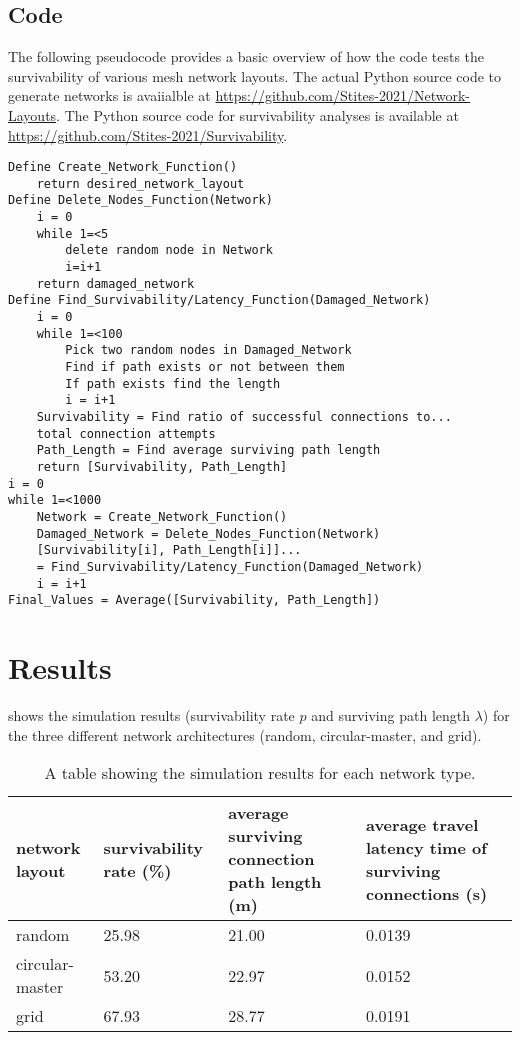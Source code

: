 \documentclass[twocolumn,10pt]{IEEEtran}
\begin{document}
\subsection{Code}
The following pseudocode provides a basic overview of how the code tests the survivability of various mesh network layouts. The actual Python source code to generate networks is avaiialble at \url{https://github.com/Stites-2021/Network-Layouts}. The Python source code for survivability analyses is available at \url{https://github.com/Stites-2021/Survivability}.  
\lstset{basicstyle=\ttfamily\scriptsize}
\begin{lstlisting}
Define Create_Network_Function()
	return desired_network_layout
Define Delete_Nodes_Function(Network)
	i = 0
	while 1=<5
		delete random node in Network 
		i=i+1
	return damaged_network
Define Find_Survivability/Latency_Function(Damaged_Network)
	i = 0
	while 1=<100
		Pick two random nodes in Damaged_Network
		Find if path exists or not between them
		If path exists find the length
		i = i+1
	Survivability = Find ratio of successful connections to... 
	total connection attempts
	Path_Length = Find average surviving path length
	return [Survivability, Path_Length]
i = 0
while 1=<1000
	Network = Create_Network_Function()
	Damaged_Network = Delete_Nodes_Function(Network)
	[Survivability[i], Path_Length[i]]...
	= Find_Survivability/Latency_Function(Damaged_Network)
	i = i+1
Final_Values = Average([Survivability, Path_Length])
\end{lstlisting}







\clearpage
\section{Results}

 shows the simulation results (survivability rate $p$ and surviving path length $\lambda$) for the three different network architectures (random, circular-master, and grid).  

\begin{table}[h]
\caption{A table showing the simulation results for each network type.}
\label{tab:results}
\begin{center}
  \begin{tabularx}{\columnwidth}{p{0.75in}p{0.75in}p{0.75in}p{0.75in}}
    \toprule
    network layout & survivability rate (\si{\percent}) & {\raggedright average surviving connection path length (\si{\meter})} & {\raggedright average travel latency time of surviving connections (\si{\second})}\\
    \midrule
    random & 25.98 & 21.00 & 0.0139\\
    circular-master & 53.20 & 22.97 & 0.0152 \\
    grid & 67.93 & 28.77 & 0.0191 \\
    \bottomrule
    \end{tabularx}
\end{center}
\end{table}
\end{document}
